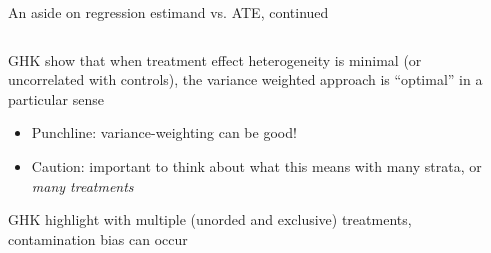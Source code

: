 \documentclass[notes,11pt, aspectratio=169]{beamer}
\newenvironment{wideitemize}{\itemize\addtolength{\itemsep}{10pt}}{\enditemize}
\begin{document}
\begin{frame}{An aside on regression estimand vs. ATE, continued}
  \begin{columns}[T] %
    \begin{column}{.5\textwidth}
  \begin{wideitemize}
  \item GHK show that when treatment effect heterogeneity is minimal
    (or uncorrelated with controls), the variance weighted approach is ``optimal'' in a particular sense
    \begin{itemize}
    \item Punchline: variance-weighting can be good!
    \item Caution: important to think about what this means with many strata, or \emph{many treatments}
    \end{itemize}
  \item GHK highlight with multiple (unorded and exclusive)
    treatments, contamination bias can occur
  \end{wideitemize}
  \end{column}%
  \hfill%
  \begin{column}{.5\textwidth}
  \end{column}
\end{columns}
\end{frame}
\end{document}
